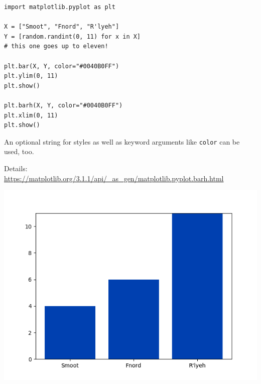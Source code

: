 
\begin{frame}[fragile]
%
\begin{codebox}[Example: Barplots, width=.58\linewidth, nobeforeafter, equal height group = grpXmpBarPlots]
\begin{verbatim}
import matplotlib.pyplot as plt

X = ["Smoot", "Fnord", "R'lyeh"]
Y = [random.randint(0, 11) for x in X]
# this one goes up to eleven!

plt.bar(X, Y, color="#0040B0FF")
plt.ylim(0, 11)
plt.show()

plt.barh(X, Y, color="#0040B0FF")
plt.xlim(0, 11)
plt.show()
\end{verbatim}

\footnotesize
An optional string for styles as well as keyword arguments like \texttt{color} can be used, too.

\vspace{6pt}
Details:\\
{\tiny \url{https://matplotlib.org/3.1.1/api/_as_gen/matplotlib.pyplot.barh.html}}
\end{codebox}
%
\begin{tcolorbox}[title=Output: Barplots, width=.4\linewidth, nobeforeafter, equal height group = grpXmpBarPlots]
	\includegraphics[width=\linewidth]{./gfx/plt-bars}
	

\end{tcolorbox}
\end{frame}
